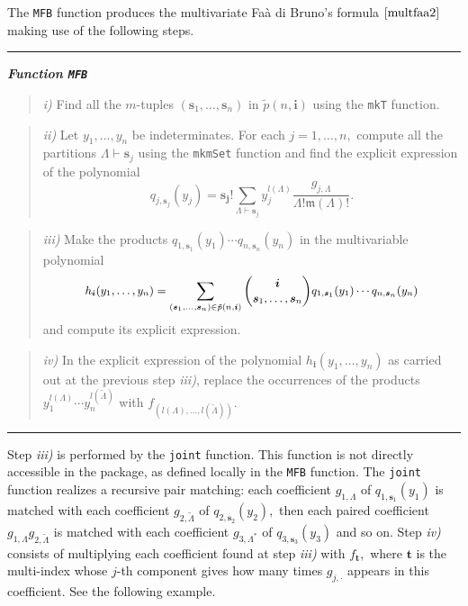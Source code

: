 The \texttt{MFB} function produces the multivariate Faà di Bruno's
formula \(\eqref{multfaa2}\) making use of the following steps.

\noindent

\rule{13cm}{0.4pt}

\textbf{\emph{Function \texttt{MFB}}}

\begin{quote}
\emph{i)} Find all the \(m\)-tuples
\((\boldsymbol{s}_1,\ldots,\boldsymbol{s}_n)\) in
\(\tilde{p}(n,\boldsymbol{i})\) using the \texttt{mkT} function.
\end{quote}

\begin{quote}
\emph{ii)} Let \(y_1, \ldots, y_n\) be indeterminates. For each
\(j=1, \ldots, n,\) compute all the partitions
\(\Lambda \vdash \boldsymbol{s}_j\) using the \texttt{mkmSet} function
and find the explicit expression of the polynomial \[
q_{j,\boldsymbol{s}_j}(y_j) = \boldsymbol{\boldsymbol{s}_j}! \sum_{{\Lambda} \vdash \boldsymbol{s}_j} y_j^{l(\Lambda)} \frac{g_{j, \Lambda}}{\Lambda!\mathfrak{m}(\Lambda)!}.
\]
\end{quote}

\begin{quote}
\emph{iii)} Make the products
\(q_{1,\boldsymbol{s}_1}(y_1) \cdots q_{n,\boldsymbol{s}_n}(y_n)\) in
the multivariable polynomial
\[{\small h_{\boldsymbol{i}}(y_1, \ldots, y_n)=\sum_{(\boldsymbol{s}_1,\ldots,\boldsymbol{s}_n) \in \tilde{p}(n,\boldsymbol{i})} {\boldsymbol{i} \choose \boldsymbol{s}_1,\ldots,\boldsymbol{s}_n} q_{1,\boldsymbol{s}_1}(y_1) \cdots q_{n,\boldsymbol{s}_n}(y_n)}\]
and compute its explicit expression.
\end{quote}

\begin{quote}
\emph{iv)} In the explicit expression of the polynomial
\(h_{\boldsymbol{i}}(y_1, \ldots, y_n)\) as carried out at the previous
step \emph{iii)}, replace the occurrences of the products
\(y_1^{l(\Lambda)} \cdots y_n^{l(\tilde{\Lambda})}\) with
\(f_{(l(\Lambda),\ldots,l(\tilde{\Lambda}))}.\)
\end{quote}

\noindent

\rule{13cm}{0.4pt}

Step \emph{iii)} is performed by the \texttt{joint} function. This
function is not directly accessible in the package, as defined locally
in the \texttt{MFB} function. The \texttt{joint} function realizes a
recursive pair matching: each coefficient \(g_{1, \Lambda}\) of
\(q_{1,\boldsymbol{s}_1}(y_1)\) is matched with each coefficient
\(g_{2, \tilde{\Lambda}}\) of \(q_{2,\boldsymbol{s}_2}(y_2),\) then each
paired coefficient \(g_{1, \Lambda} g_{2, \tilde{\Lambda}}\) is matched
with each coefficient \(g_{3, \Lambda^{\!*}}\) of
\(q_{3,\boldsymbol{s}_3}(y_3)\) and so on. Step \emph{iv)} consists of
multiplying each coefficient found at step \emph{iii)} with
\(f_{\boldsymbol{t}},\) where \(\boldsymbol{t}\) is the multi-index
whose \(j\)-th component gives how many times \(g_{j, \cdot}\) appears
in this coefficient. See the following example.

